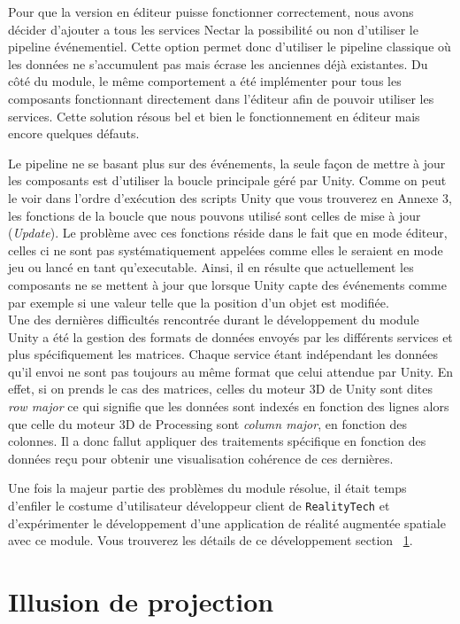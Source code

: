 Pour que la version en éditeur puisse fonctionner correctement, nous avons décider d'ajouter a tous les services Nectar la possibilité ou non d'utiliser le pipeline événementiel. Cette option permet donc d'utiliser le pipeline classique où les données ne s'accumulent pas mais écrase les anciennes déjà existantes. Du côté du module, le même comportement a été implémenter pour tous les composants fonctionnant directement dans l'éditeur afin de pouvoir utiliser les services. Cette solution résous bel et bien le fonctionnement en éditeur mais encore quelques défauts.

Le pipeline ne se basant plus sur des événements, la seule façon de mettre à jour les composants est d'utiliser la boucle principale géré par Unity. Comme on peut le voir dans l'ordre d'exécution des scripts Unity que vous trouverez en Annexe 3, les fonctions de la boucle que nous pouvons utilisé sont celles de mise à jour (\emph{Update}). Le problème avec ces fonctions réside dans le fait que en mode éditeur, celles ci ne sont pas systématiquement appelées comme elles le seraient en mode jeu ou lancé en tant qu'executable. Ainsi, il en résulte que actuellement les composants ne se mettent à jour que lorsque Unity capte des événements comme par exemple si une valeur telle que la position d'un objet est modifiée.\\

Une des dernières difficultés rencontrée durant le développement du module Unity a été la gestion des formats de données envoyés par les différents services et plus spécifiquement les matrices. Chaque service étant indépendant les données qu'il envoi ne sont pas toujours au même format que celui attendue par Unity. En effet, si on prends le cas des matrices, celles du moteur 3D de Unity sont dites \emph{row major} ce qui signifie que les données sont indexés en fonction des lignes alors que celle du moteur 3D de Processing sont \emph{column major}, en fonction des colonnes. Il a donc fallut appliquer des traitements spécifique en fonction des données reçu pour obtenir une visualisation cohérence de ces dernières.

Une fois la majeur partie des problèmes du module résolue, il était temps d'enfiler le costume d'utilisateur développeur client de \texttt{RealityTech} et d'expérimenter le développement d'une application de réalité augmentée spatiale avec ce module. Vous trouverez les détails de ce développement section ~\ref{sec:unity:appli}.

\section{Illusion de projection}
\label{sec:unity:appli}

